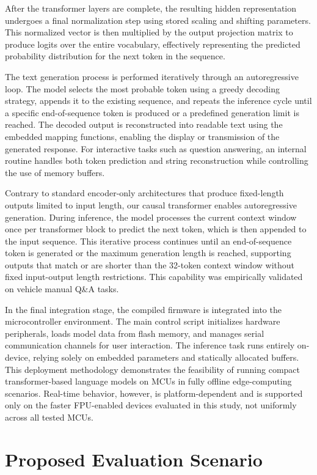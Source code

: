 \documentclass{ieeeaccess}
\begin{document}
After the transformer layers are complete, the resulting hidden representation undergoes a final normalization step using stored scaling and shifting parameters. This normalized vector is then multiplied by the output projection matrix to produce logits over the entire vocabulary, effectively representing the predicted probability distribution for the next token in the sequence.

The text generation process is performed iteratively through an autoregressive loop. The model selects the most probable token using a greedy decoding strategy, appends it to the existing sequence, and repeats the inference cycle until a specific end-of-sequence token is produced or a predefined generation limit is reached. The decoded output is reconstructed into readable text using the embedded mapping functions, enabling the display or transmission of the generated response. For interactive tasks such as question answering, an internal routine handles both token prediction and string reconstruction while controlling the use of memory buffers.

Contrary to standard encoder-only architectures that produce fixed-length outputs limited to input length, our causal transformer enables autoregressive generation. During inference, the model processes the current context window once per transformer block to predict the next token, which is then appended to the input sequence. This iterative process continues until an end-of-sequence token is generated or the maximum generation length is reached, supporting outputs that match or are shorter than the 32-token context window without fixed input-output length restrictions. This capability was empirically validated on vehicle manual Q\&A tasks.

In the final integration stage, the compiled firmware is integrated into the microcontroller environment. The main control script initializes hardware peripherals, loads model data from flash memory, and manages serial communication channels for user interaction. The inference task runs entirely on-device, relying solely on embedded parameters and statically allocated buffers. This deployment methodology demonstrates the feasibility of running compact transformer-based language models on MCUs in fully offline edge-computing scenarios. Real-time behavior, however, is platform-dependent and is supported only on the faster FPU-enabled devices evaluated in this study, not uniformly across all tested MCUs.


\section{Proposed Evaluation Scenario}
\label{sec:exp_setup}
\end{document}
